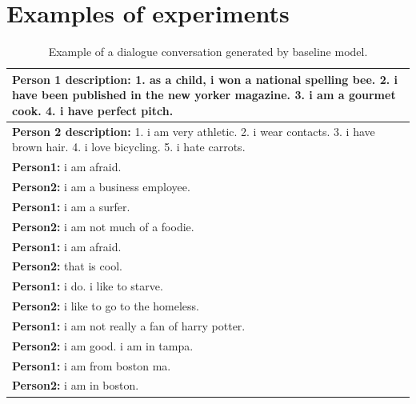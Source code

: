 \chapter{Examples of experiments}

\begin{table}[ht]
\centering
 \begin{tabular}{|p{14cm}|}
 \hline\hline
 \textbf{Person 1 description:} 1. as a child, i won a national spelling bee. 2. i have been published in the new yorker magazine. 3. i am a gourmet cook. 4. i have perfect pitch. \\
 \hline
 \textbf{Person 2 description:} 1. i am very athletic. 2. i wear contacts. 3. i have brown hair. 4. i love bicycling. 5. i hate carrots. \\
 \hline\hline
 \textbf{Person1:} i am afraid. \\
 \textbf{Person2:} i am a business employee.  \\ 
 \textbf{Person1:} i am a surfer. \\
 \textbf{Person2:} i am not much of a foodie. \\
 \textbf{Person1:} i am afraid. \\
 \textbf{Person2:} that is cool. \\
 \textbf{Person1:} i do. i like to starve. \\
 \textbf{Person2:} i like to go to the homeless. \\
 \textbf{Person1:} i am not really a fan of harry potter. \\
 \textbf{Person2:} i am good. i am in tampa. \\
 \textbf{Person1:} i am from boston ma. \\
 \textbf{Person2:} i am in boston. \\
 \hline\hline
 \end{tabular}
 \caption{Example of a dialogue conversation generated by baseline model.}
\label{tab:baseline_experiment}
\end{table}

